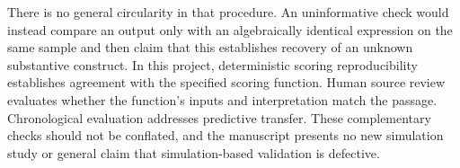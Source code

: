 There is no general circularity in that procedure. An uninformative check would instead compare an output only with an algebraically identical expression on the same sample and then claim that this establishes recovery of an unknown substantive construct. In this project, deterministic scoring reproducibility establishes agreement with the specified scoring function. Human source review evaluates whether the function's inputs and interpretation match the passage. Chronological evaluation addresses predictive transfer. These complementary checks should not be conflated, and the manuscript presents no new simulation study or general claim that simulation-based validation is defective.

